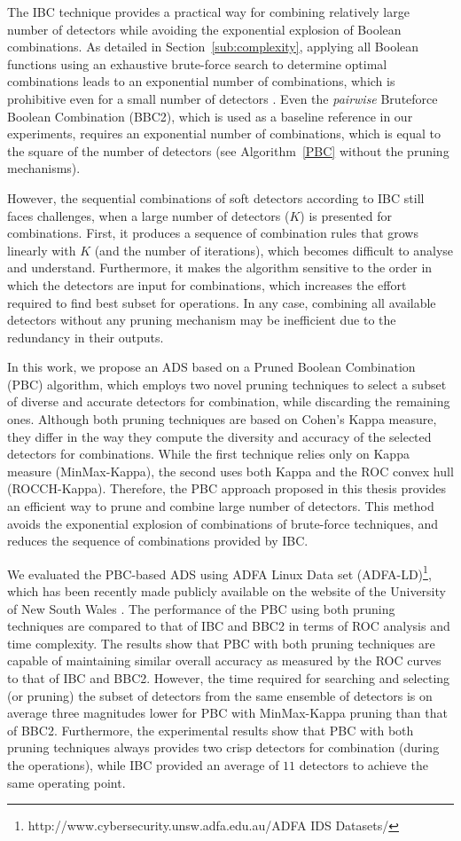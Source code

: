 The IBC technique provides a practical way for combining relatively large number of detectors while avoiding the exponential explosion of Boolean combinations.
As detailed in Section~\ref{sub:complexity}, applying all Boolean functions using an exhaustive brute-force search to determine optimal combinations leads to an exponential number of combinations, which is prohibitive even for a small number of detectors \cite{Barreno2008}.
Even the \textit{pairwise} Bruteforce Boolean Combination (BBC2), which is used as a baseline reference in our experiments, requires an exponential number of combinations, which is equal to the square of the number of detectors (see Algorithm~\ref{PBC} without the pruning mechanisms).

However, the sequential combinations of soft detectors according to IBC still faces challenges, when a large number of detectors ($K$) is presented for combinations.
First, it produces a sequence of combination rules that grows linearly with $K$ (and the number of iterations), which becomes difficult to analyse and understand.
Furthermore, it makes the algorithm sensitive to the order in which the detectors are input for combinations, which increases the effort required to find best subset for operations.
In any case, combining all available detectors without any pruning mechanism may be inefficient due to the redundancy in their outputs.

In this work, we propose an ADS based on a Pruned Boolean Combination (PBC) algorithm, which employs two novel pruning techniques to select a subset of diverse and accurate detectors for combination, while discarding the remaining ones.
Although both pruning techniques are based on Cohen's Kappa \cite{Cohen1995a} measure, they differ in the way they compute the diversity and accuracy of the selected detectors for combinations.
While the first technique relies only on Kappa measure (MinMax-Kappa), the second uses both Kappa and the ROC convex hull (ROCCH-Kappa).
Therefore, the PBC approach proposed in this thesis provides an efficient way to prune and combine large number of detectors. This method avoids the exponential explosion of combinations of brute-force techniques, and reduces the sequence of combinations provided by IBC.

We evaluated the PBC-based ADS using ADFA Linux Data set (ADFA-LD)\footnote{http://www.cybersecurity.unsw.adfa.edu.au/ADFA IDS Datasets/}, which has been recently made publicly available on the website of the University of New South Wales \cite{Creech2013a}.
The performance of the PBC using both pruning techniques are compared to that of IBC and BBC2 in terms of ROC analysis and time complexity.
The results show that PBC with both pruning techniques are capable of maintaining similar overall accuracy as measured by the ROC curves to that of IBC and BBC2.
However, the time required for searching and selecting (or pruning) the subset of detectors from the same ensemble of detectors is on average three magnitudes lower for PBC with MinMax-Kappa pruning than that of BBC2.
Furthermore, the experimental results show that PBC with both pruning techniques always provides two crisp detectors for combination (during the operations), while IBC provided an average of $11$ detectors to achieve the same operating point.


